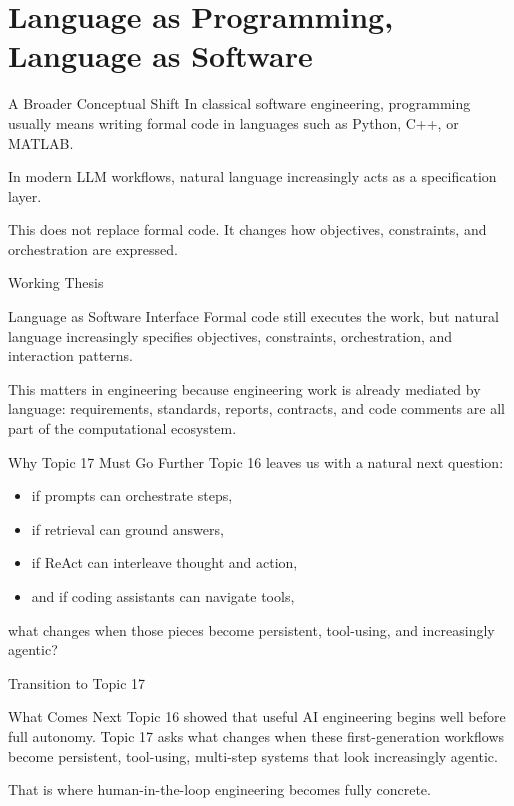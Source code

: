 \documentclass[12pt]{beamer}
\begin{document}
\section{Language as Programming, Language as Software}

\begin{frame}{A Broader Conceptual Shift}
  In classical software engineering, programming usually means writing formal code in languages such as Python, C++, or MATLAB.

  In modern LLM workflows, natural language increasingly acts as a specification layer.

  This does not replace formal code. It changes how objectives, constraints, and orchestration are expressed.
\end{frame}

\begin{frame}{Working Thesis}
  \begin{conceptbox}{Language as Software Interface}
    Formal code still executes the work, but natural language increasingly specifies objectives, constraints, orchestration, and interaction patterns.
  \end{conceptbox}

  This matters in engineering because engineering work is already mediated by language: requirements, standards, reports, contracts, and code comments are all part of the computational ecosystem.
\end{frame}

\begin{frame}{Why Topic 17 Must Go Further}
  Topic 16 leaves us with a natural next question:
  \begin{itemize}
    \item if prompts can orchestrate steps,
    \item if retrieval can ground answers,
    \item if ReAct can interleave thought and action,
    \item and if coding assistants can navigate tools,
  \end{itemize}

  what changes when those pieces become persistent, tool-using, and increasingly agentic?
\end{frame}

\begin{frame}{Transition to Topic 17}
  \begin{warningbox}{What Comes Next}
    Topic 16 showed that useful AI engineering begins well before full autonomy. Topic 17 asks what changes when these first-generation workflows become persistent, tool-using, multi-step systems that look increasingly agentic.
  \end{warningbox}

  That is where human-in-the-loop engineering becomes fully concrete.
\end{frame}
\end{document}
